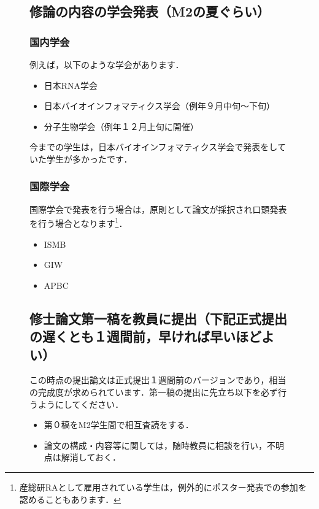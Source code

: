 \documentclass[dvipdfmx,autodetect-engine]{jsreport}
\begin{document}
\begin{figure}[h]
{\subsection{修論の内容の学会発表（M2の夏ぐらい）}

\subsubsection{国内学会}

例えば，以下のような学会があります．
\begin{itemize}
\item 日本RNA学会
\item 日本バイオインフォマティクス学会（例年９月中旬〜下旬）
\item 分子生物学会（例年１２月上旬に開催）
\end{itemize}

今までの学生は，日本バイオインフォマティクス学会で発表をしていた学生が多かったです．

\subsubsection{国際学会}

国際学会で発表を行う場合は，原則として論文が採択され口頭発表を行う場合となります\footnote{産総研RAとして雇用されている学生は，例外的にポスター発表での参加を認めることもあります．}．

\begin{itemize}
\item ISMB
\item GIW
\item APBC
\end{itemize}

\subsection{修士論文第一稿を教員に提出（下記正式提出の遅くとも１週間前，早ければ早いほどよい）}

この時点の提出論文は正式提出１週間前のバージョンであり，相当の完成度が求められています．第一稿の提出に先立ち以下を必ず行うようにしてください．

\begin{itemize}
\item 第０稿をM2学生間で相互査読をする．
\item 論文の構成・内容等に関しては，随時教員に相談を行い，不明点は解消しておく．
\end{itemize}


}
\end{figure}
\end{document}
